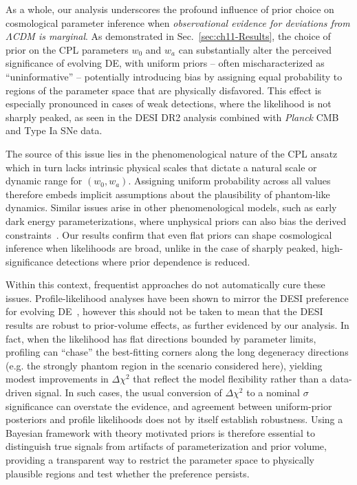 As a whole, our analysis underscores the profound influence of prior choice on cosmological parameter inference when \textit{observational evidence for deviations from $\Lambda$CDM is marginal}. As demonstrated in Sec.~\ref{sec:ch11-Results}, the choice of prior on the CPL parameters $w_0$ and $w_a$ can substantially  alter the perceived significance of evolving DE, with uniform priors -- often mischaracterized as ``uninformative'' -- potentially introducing bias by assigning equal probability to regions of the parameter space that are physically disfavored. This effect is especially pronounced in cases of weak detections, where the likelihood is not sharply peaked, as seen in the DESI DR2 analysis combined with \textit{Planck} CMB and Type Ia SNe data.

The source of this issue lies in the phenomenological nature of the CPL ansatz
which in turn lacks intrinsic physical scales that dictate a natural scale or dynamic range  for $(w_0,w_a)$. Assigning uniform probability across all values
therefore embeds implicit assumptions
about the plausibility of phantom-like dynamics. Similar issues arise in other phenomenological models, such as early dark energy parameterizations, where unphysical priors can also bias the derived constraints~\cite{Toomey:2024ita}. Our results confirm that even flat priors
can shape cosmological inference when likelihoods are broad, unlike in the case of sharply peaked, high-significance detections where prior dependence is reduced.


Within this context, frequentist approaches do not automatically cure these issues.
Profile-likelihood analyses have been shown to mirror the DESI preference for evolving DE~\cite{Herold:2025hkb}, however this should not be taken to mean that the DESI results are robust to prior-volume effects, as further evidenced by our analysis. In fact, when the likelihood has flat directions bounded by parameter limits, profiling can ``chase'' the best-fitting corners along the long degeneracy directions (e.g. the strongly phantom region in the scenario considered here), yielding modest improvements in $\Delta\chi^2$ that reflect the model flexibility rather than a data-driven signal. In such cases, the usual conversion of
$\Delta\chi^2$ to a nominal $\sigma$ significance can overstate the evidence, and agreement between uniform-prior posteriors and profile likelihoods does not by itself establish robustness. Using a Bayesian framework with theory motivated priors is therefore essential to distinguish true signals from artifacts of parameterization and prior volume, providing a transparent way to restrict the parameter space to physically plausible regions and test whether the preference persists.


